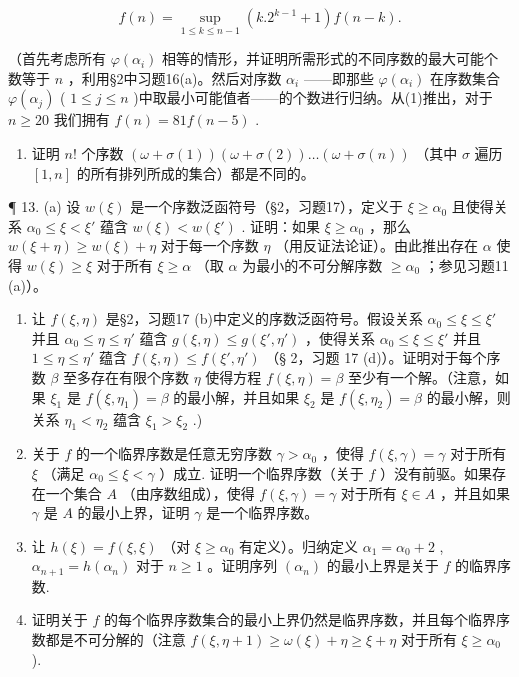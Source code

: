 \[
f (n) = \sup _ {1 \leqslant k \leqslant n - 1} (k. 2 ^ {k - 1} + 1) f (n - k).\tag{1}
\]

（首先考虑所有 \(\varphi(\alpha_i)\) 相等的情形，并证明所需形式的不同序数的最大可能个数等于 \(n\) ，利用§2中习题16(a)。然后对序数 \(\alpha_i\) ——即那些 \(\varphi(\alpha_i)\) 在序数集合 \(\varphi(\alpha_j)\) ( \(1 \leqslant j \leqslant n\) )中取最小可能值者——的个数进行归纳。从(1)推出，对于 \(n \geqslant 20\) 我们拥有 \(f(n) = 81f(n - 5)\) .

\begin{enumerate}
\def\labelenumi{(\alph{enumi})}
\setcounter{enumi}{2}
\tightlist
\item
  证明 \(n!\) 个序数 \((\omega + \sigma(1)) (\omega + \sigma(2)) \ldots (\omega + \sigma(n))\) （其中 \(\sigma\) 遍历 \([1, n]\) 的所有排列所成的集合）都是不同的。
\end{enumerate}

¶ 13. (a) 设 \(w(\xi)\) 是一个序数泛函符号（§2，习题17），定义于 \(\xi \geqslant \alpha_0\) 且使得关系 \(\alpha_0 \leqslant \xi < \xi'\) 蕴含 \(w(\xi) < w(\xi')\) . 证明：如果 \(\xi \geqslant \alpha_0\) ，那么 \(w(\xi + \eta) \geqslant w(\xi) + \eta\) 对于每一个序数 \(\eta\) （用反证法论证）。由此推出存在 \(\alpha\) 使得 \(w(\xi) \geqslant \xi\) 对于所有 \(\xi \geqslant \alpha\) （取 \(\alpha\) 为最小的不可分解序数 \(\geqslant \alpha_0\) ；参见习题11 (a)）。

\begin{enumerate}
\def\labelenumi{(\alph{enumi})}
\setcounter{enumi}{1}
\item
  让 \(f(\xi, \eta)\) 是§2，习题17 (b)中定义的序数泛函符号。假设关系 \(\alpha_0 \leqslant \xi \leqslant \xi'\) 并且 \(\alpha_0 \leqslant \eta \leqslant \eta'\) 蕴含 \(g(\xi, \eta) \leqslant g(\xi', \eta')\) ，使得关系 \(\alpha_0 \leqslant \xi \leqslant \xi'\) 并且 \(1 \leqslant \eta \leqslant \eta'\) 蕴含 \(f(\xi, \eta) \leqslant f(\xi', \eta')\) （§ 2，习题 17 (d)）。证明对于每个序数 \(\beta\) 至多存在有限个序数 \(\eta\) 使得方程 \(f(\xi, \eta) = \beta\) 至少有一个解。（注意，如果 \(\xi_1\) 是 \(f(\xi, \eta_1) = \beta\) 的最小解，并且如果 \(\xi_2\) 是 \(f(\xi, \eta_2) = \beta\) 的最小解，则关系 \(\eta_1 < \eta_2\) 蕴含 \(\xi_1 > \xi_2\) .)
\item
  关于 \(f\) 的一个临界序数是任意无穷序数 \(\gamma > \alpha_0\) ，使得 \(f(\xi, \gamma) = \gamma\) 对于所有 \(\xi\) （满足 \(\alpha_0 \leqslant \xi < \gamma\) ）成立. 证明一个临界序数（关于 \(f\) ）没有前驱。如果存在一个集合 \(A\) （由序数组成），使得 \(f(\xi, \gamma) = \gamma\) 对于所有 \(\xi \in A\) ，并且如果 \(\gamma\) 是 \(A\) 的最小上界，证明 \(\gamma\) 是一个临界序数。
\item
  让 \(h(\xi) = f(\xi, \xi)\) （对 \(\xi \geqslant \alpha_0\) 有定义）。归纳定义 \(\alpha_1 = \alpha_0 + 2\) , \(\alpha_{n+1} = h(\alpha_n)\) 对于 \(n \geqslant 1\) 。证明序列 \((\alpha_n)\) 的最小上界是关于 \(f\) 的临界序数.
\item
  证明关于 \(f\) 的每个临界序数集合的最小上界仍然是临界序数，并且每个临界序数都是不可分解的（注意 \(f(\xi, \eta + 1) \geqslant \omega(\xi) + \eta \geqslant \xi + \eta\) 对于所有 \(\xi \geqslant \alpha_0\) ).
\end{enumerate}

